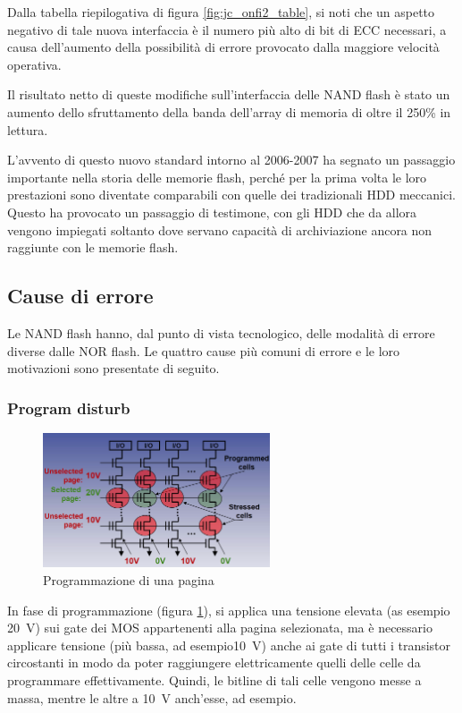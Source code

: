 \documentclass[11pt,4paper]{report}
\begin{document}
Dalla tabella riepilogativa di figura \ref{fig:jc_onfi2_table}, si noti che un aspetto negativo di tale nuova interfaccia è il numero più alto di bit di ECC necessari, a causa dell'aumento della possibilità di errore provocato dalla maggiore velocità operativa.

Il risultato netto di queste modifiche sull'interfaccia delle NAND flash è stato un aumento dello sfruttamento della banda dell'array di memoria di oltre il 250\% in lettura.

L'avvento di questo nuovo standard intorno al 2006-2007 ha segnato un passaggio importante nella storia delle memorie flash, perché per la prima volta le loro prestazioni sono diventate comparabili con quelle dei tradizionali HDD meccanici. Questo ha provocato un passaggio di testimone, con gli HDD che da allora vengono impiegati soltanto dove servano capacità di archiviazione ancora non raggiunte con le memorie flash.

\subsection{Cause di errore}
Le NAND flash hanno, dal punto di vista tecnologico, delle modalità di errore diverse dalle NOR flash. Le quattro cause più comuni di errore e le loro motivazioni sono presentate di seguito.

\subsubsection{Program disturb}
\begin{figure}[hbtp]
	\centering
	\includegraphics[width=0.6\textwidth]{memorie/jc_program_disturb}
	\caption{Programmazione di una pagina}
	\label{fig:jc_program_disturb}
\end{figure}
In fase di programmazione (figura \ref{fig:jc_program_disturb}), si applica una tensione elevata (as esempio \SI{20}{\volt}) sui gate dei MOS appartenenti alla pagina selezionata, ma è necessario applicare tensione (più bassa, ad esempio\SI{10}{\volt}) anche ai gate di tutti i transistor circostanti in modo da poter raggiungere elettricamente quelli delle celle da programmare effettivamente. 
Quindi, le bitline di tali celle vengono messe a massa, mentre le altre a \SI{10}{\volt} anch'esse, ad esempio.
\end{document}
